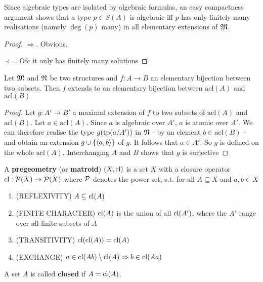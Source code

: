 \documentclass[11pt]{article}
\def \acl {\text{acl}}
\begin{document}
\begin{remark}
Since algebraic types are isolated by algebraic formulas, an easy compactness argument shows that
a type \(p\in S(A)\) is algebraic iff \(p\) has only finitely many realisations (namely \(\deg(p)\)
many) in all elementary extensions of \(\mathfrak{M}\).
\end{remark}

\begin{proof}
\(\Rightarrow\). Obvious.

\(\Leftarrow\). Ofc it only has finitely many solutions
\end{proof}

\begin{lemma}[]
\label{lemma5.6.4}
Let \(\mathfrak{M}\) and \(\mathfrak{N}\) be two structures and \(f:A\to B\) an elementary bijection between two subsets.
Then \(f\) extends to an elementary bijection between \(\acl(A)\) and \(\acl(B)\)
\end{lemma}

\begin{proof}
Let \(g:A'\to B'\) a maximal extension of \(f\) to two subsets of \(\acl(A)\) and \(\acl(B)\).
Let \(a\in \acl(A)\). Since \(a\) is algebraic over \(A'\), \(a\) is atomic over \(A'\). We can
therefore realise the type \(g(\operatorname{tp}(a/ A'))\) in \(\mathfrak{N}\) - by an element \(b\in\acl(B)\) - and obtain
an extension \(g\cup\{\langle a,b\rangle\}\) of \(g\). It follows that \(a\in A'\). So \(g\) is defined on the
whole \(\acl(A)\). Interchanging \(A\) and \(B\) shows that \(g\) is surjective
\end{proof}

\begin{definition}[]
A \textbf{pregeometry} (or \textbf{matroid}) \((X,\operatorname{\text{cl}})\) is a set \(X\) with a closure operator \(\operatorname{\text{cl}}:\mathcal{P}(X)\to\mathcal{P}(X)\)
where \(\mathcal{P}\) denotes the power set, s.t. for all \(A\subseteq X\) and \(a,b\in X\)
\begin{enumerate}
\item (REFLEXIVITY) \(A\subseteq\operatorname{\text{cl}}(A)\)
\item (FINITE CHARACTER) \(\operatorname{\text{cl}}(A)\) is the union of all \(\operatorname{\text{cl}}(A')\), where the \(A'\) range over all
finite subsets of \(A\)
\item (TRANSITIVITY) \(\operatorname{\text{cl}}(\operatorname{\text{cl}}(A))=\operatorname{\text{cl}}(A)\)
\item (EXCHANGE) \(a\in\operatorname{\text{cl}}(Ab)\setminus\operatorname{\text{cl}}(A)\Rightarrow b\in\operatorname{\text{cl}}(Aa)\)
\end{enumerate}
\end{definition}

A set \(A\) is called \textbf{closed} if \(A=\operatorname{\text{cl}}(A)\).
\end{document}
